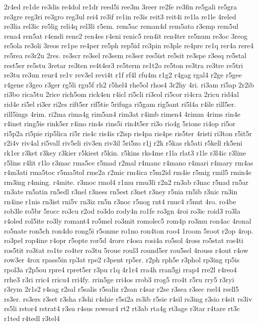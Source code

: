 {2r4ed
re1de
re3dis
re4dol
re1dr
reed5i
ree3m
3reer
re2fe
re3fin
re5gali
re5gra
re3gre
reg3ri
re3gro
reg3ul
rei4
re3if
re1in
re3is
reit3
reit4i
re1la
re1le
4reled
re3lia
rel3ic
re5lig
reli4q
rel3li
r5em.
rem5ac
reman4d
rem5ato
r3emp
rem5ul
rena4
ren5at
r4endi
rene2
ren4es
r4eni
renic5
ren4it
ren4ter
re5num
re3oc
3reog
re5ola
re3oli
3reos
re1pe
re4per
re5ph
rep5id
re3pin
re3ple
re4pre
re1q
rer4a
rere4
re5rea
re3r2u
2res.
re3scr
re3sel
re3sem
re3ser
res5ist
re5sit
re3spe
r3esq
re5stal
rest5er
re5stu
3retar
re3ten
re4t4er3
re5term
re1t2o
re5ton
re3tra
re3tre
re5tri
re3tu
re3un
reur4
re1v
rev3el
revi4t
r1f
rf4l
rfu4m
r1g2
r4gag
rgal4
r2ge
r5gee
r4gene
r3geo
r3ger
rg5li
rgu5f
rh2
r5hel4
rhe5ol
rhos4
3r2hy
4ri.
ri3am
ri5ap
2r2ib
ri3bo
rica5tu
2rice
rich5om
rick4en
r4icl
ri5cli
ri3col
ri5cor
ri4cra
2ricu
rid4al
rid4e
ri5el
ri3er
ri2es
rift5er
rif5tie
5rifuga
ri5gam
rig5ant
ri5l4a
r4ile
rill5er.
rill5ings
4rim.
ri2ma
rima4g
rim5an4
rim3at
r4imb
rimen4
4rimm
4rims
rin4e
r4inet
ring5ie
rink5er
r4ino
rin4s
rins5i
rin4t5er
ri3o
rio4g
5rione
ri4op
ri5or
ri5p2a
ri5pie
rip5lica
ri5r
ris4c
ris4is
r2isp
ris4pa
ris4pe
ris5ter
4risti
ri3ton
r5it5r
r2i4v
riv4al
ri5vall
riv5eli
riv3en
riv3il
5ri5zo
r1j
r2k
r5kas
rk5ati
r5kell
rk5eni
rk1er
r3ket
r3key
r3kier
r5kiest
r5kin.
r5kins
rks4me
r1la
rlat3
r1le
r3l4ic
r3line
r5lins
r4lit
r1lo
r3mac
rma5ce
r5mad
r2mal
r4manc
r4mano
r4mari
r4mary
rm4as
r4m3ati
rma5toc
r5ma5tol
rme2a
r2mic
rm4ica
r5m2id
rm4ie
r5mig
rmil5
rmin4e
rm3ing
r4ming.
r4mite.
r3moc
rmol4
r1mu
rmu3li
r2n2
rn3ab
r3nac
r5nad
rn5ar
rn3ate
rn5atin
rn5edl
r3nel
r3ness
rn5est
r3net
r3ney
r5nia
rn5ib
r3nic
rn3in
rn4ine
r1nis
rn3ist
rni5v
rn3iz
rn5n
r3noc
r5nog
rnt4
rnuc4
r5nut
4ro.
ro4be
rob3le
ro5br
5rocc
ro3cu
r2od
ro3do
rody4n
ro1fe
ro3gn
4roi
ro3ic
roid3
ro3la
r4oled
rol5ite
ro3ly
romant4
ro5mel
ro3mit
romolec5
rom4p
ro3mu
ron4ac
4ronal
ro5nate
ron5ch
ron4do
rong5i
r5onme
ro1no
ron4ton
roo4
1room
5root
r2op
4rop.
ro3pel
rop4ine
r4opr
r5opte
ror5d
4rore
r4osa
rosi4a
ro5sol
4ross
ro5stat
ros4ti
ros5tit
ro3tat
ro1te
ro4ter
ro3tu
5roue
roul3
round5er
rou5sel
4rouss
r4out
r4ow
row3er
4rox
rpass5in
rp3at
rpe2
r3pent
rp5er.
r2ph
rph5e
r3phol
rp3ing
rp5is
rpol3a
r2p5ou
rpre4
rpret5er
r3pu
r1q
4r1r4
rra4h
rran5gi
rrap4
rre2l
r4reo4
rrhe3
r3ri
rric4
rricu4
rri4fy.
rrin5ge
rri4os
rrob3
rrog5
rro4t
r5ru
rry5
r3ryi
r3rym
2r1s2
r4sag
r2sal
r5salis
r5saliz
r2san
r4sar
r2se
r3sea
r3sec
rsel4
rsell5
rs3er.
rs3ers
r3set
r3sha
r3shi
r4shie
r5si2a
rs3ib
r5sie
r4sil
rs3ing
r3sio
r4sit
rs3iv
rs5li
rstor4
rstrat4
r3su
r4sus
rswear4
rt2
rt3ab
rta4g
rt3age
r3tar
r4tare
rt3c
r1ted
r4tedl
r3tel4
}
